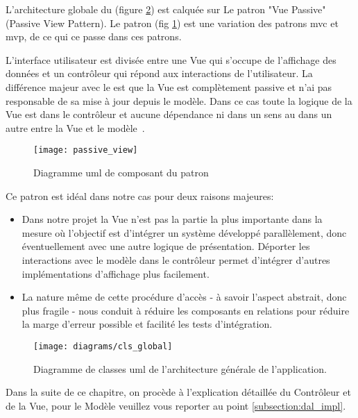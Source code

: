 L'architecture globale du   (figure \ref{fig:cls_global})
est calquée sur Le patron "Vue Passive" (Passive View Pattern). Le patron
 (fig \ref{fig:passive_view}) est une variation des
patrons \gls{mvc} et \gls{mvp}, de ce qui ce passe dans ces patrons.

L'interface utilisateur est divisée entre une Vue qui s'occupe de
l'affichage des données et un contrôleur qui répond aux interactions de
l'utilisateur. La différence majeur avec le  est que la
Vue est complètement passive et n'ai pas responsable de sa mise à jour
depuis le modèle. Dans ce cas toute la logique de la Vue est dans le
contrôleur et aucune dépendance ni dans un sens au dans un autre entre
la Vue et le modèle~\cite{fowler:passive_view}.

\begin{figure}
\center
\texttt{[image: passive\_view]}
\caption{Diagramme \gls{uml} de composant du patron ~\cite{fowler:passive_view}}
\label{fig:passive_view}
\end{figure}

Ce patron est idéal dans notre cas pour deux raisons majeures:

\begin{itemize} 

\item Dans notre projet la Vue n'est pas la partie la plus importante
dans la mesure où l'objectif est d'intégrer un système développé
parallèlement, donc éventuellement avec une autre logique de
présentation. Déporter les interactions avec le modèle dans le
contrôleur permet d'intégrer d'autres implémentations d'affichage plus
facilement.

\item La nature même de cette procédure d’accès - à savoir l’aspect
abstrait, donc plus fragile - nous conduit à réduire les composants en
relations pour réduire la marge d'erreur possible et facilité les tests d’intégration.

\end{itemize}

\begin{figure}
\center
\texttt{[image: diagrams/cls\_global]}
\caption{Diagramme de classes \gls{uml} de l'architecture générale de l'application.}
\label{fig:cls_global}
\end{figure}

Dans la suite de ce chapitre, on procède à l'explication détaillée du Contrôleur
et de la Vue, pour le Modèle veuillez vous reporter au point
\ref{subsection:dal_impl}.

